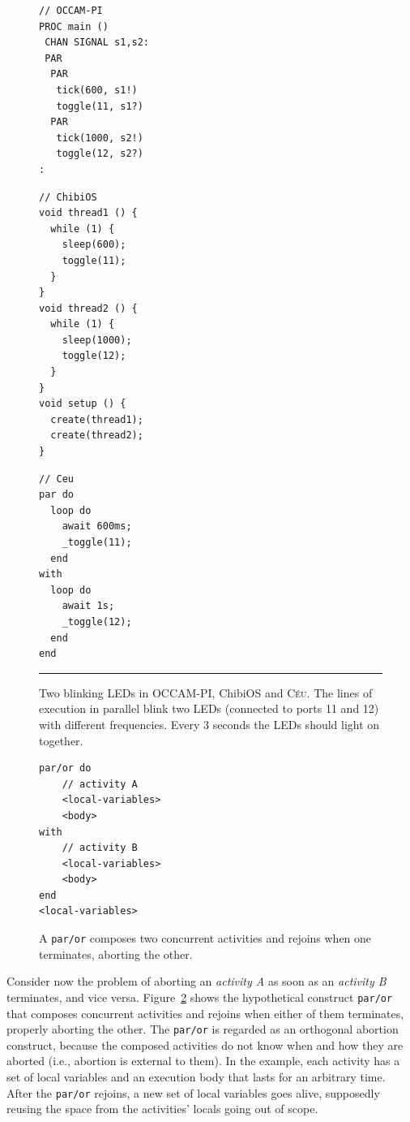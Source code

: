 \documentclass{acm_proc_article-sp}
\newcommand{\CEU}{\textsc{C\'{e}u}\xspace}
\newcommand{\code}[1] {{\small{\texttt{#1}}}}
\newcommand{\1}{\;}
\newcommand{\2}{\;\;}
\newcommand{\3}{\;\;\;}
\newcommand{\5}{\;\;\;\;\;}
\begin{document}
\begin{figure}[t]
\begin{minipage}[t]{0.34\linewidth}
\begin{lstlisting}
// OCCAM-PI
PROC main ()
 CHAN SIGNAL s1,s2:
 PAR
  PAR
   tick(600, s1!)
   toggle(11, s1?)
  PAR
   tick(1000, s2!)
   toggle(12, s2?)
:

\end{lstlisting}
\end{minipage}
%
\begin{minipage}[t]{0.33\linewidth}
\begin{lstlisting}
// ChibiOS
void thread1 () {
  while (1) {
    sleep(600);
    toggle(11);
  }
}
void thread2 () {
  while (1) {
    sleep(1000);
    toggle(12);
  }
}
void setup () {
  create(thread1);
  create(thread2);
}

\end{lstlisting}
\end{minipage}
%
\begin{minipage}[t]{0.31\linewidth}
\begin{lstlisting}
// Ceu
par do
  loop do
    await 600ms;
    _toggle(11);
  end
with
  loop do
    await 1s;
    _toggle(12);
  end
end
\end{lstlisting}
\end{minipage}
%
\rule{8.5cm}{0.37pt}
\caption{ Two blinking LEDs in OCCAM-PI, ChibiOS and \CEU.\newline
{\small %
The lines of execution in parallel blink two LEDs (connected to ports 11 and 
12) with different frequencies.
Every 3 seconds the LEDs should light on together.
}%
\label{lst.leds}
}
\end{figure}


\begin{figure}[t]
\begin{lstlisting}
par/or do
    // activity A
    <local-variables>
    <body>
with
    // activity B
    <local-variables>
    <body>
end
<local-variables>
\end{lstlisting}
\caption{ A \code{par/or} composes two concurrent activities and rejoins when 
one terminates, aborting the other.\newline
{\small %
}%
\label{lst.abortion}
}
\end{figure}

Consider now the problem of aborting an \emph{activity A} as soon as an
\emph{activity B} terminates, and vice versa.
%
Figure~\ref{lst.abortion} shows the hypothetical construct \code{par/or} that 
composes concurrent activities and rejoins when either of them terminates, 
properly aborting the other.
%
The \code{par/or} is regarded as an orthogonal abortion construct, because the 
composed activities do not know when and how they are aborted (i.e., abortion 
is external to them).
%
In the example, each activity has a set of local variables and an execution 
body that lasts for an arbitrary time.
After the \code{par/or} rejoins, a new set of local variables goes alive, 
supposedly reusing the space from the activities' locals going out of scope.
\end{document}

